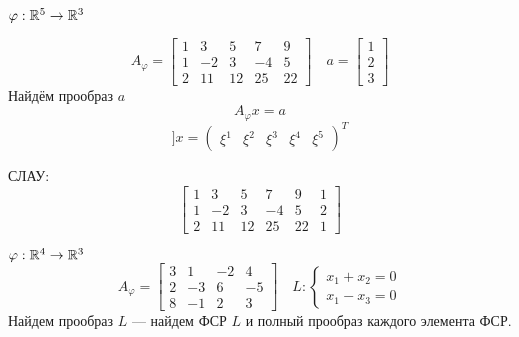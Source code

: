 \begin{example}
    $\varphi : \mathbb{R}^5\to\mathbb{R}^3$

    $$A_\varphi = \begin{bmatrix}
        1 & 3 & 5 & 7 & 9 \\
        1 & -2 & 3 & -4 & 5 \\
        2 & 11 & 12 & 25 & 22
    \end{bmatrix} \quad a=\begin{bmatrix} 1 \\ 2 \\ 3\end{bmatrix}$$
    Найдём прообраз $a$
    $$A_\varphi x = a$$
    $$] x = \begin{pmatrix}
        \xi^1 & \xi^2 & \xi^3 & \xi^4 & \xi^5
    \end{pmatrix}^T$$

    СЛАУ:
    $$\begin{bmatrix}
        1 & 3 & 5 & 7 & 9 & 1 \\
        1 & -2 & 3 & -4 & 5 & 2 \\
        2 & 11 & 12 & 25 & 22 & 1
    \end{bmatrix}$$
\end{example}

\begin{example}
    $\varphi : \mathbb{R}^4 \to \mathbb{R}^3$
    $$A_\varphi = \begin{bmatrix}
        3 & 1 & -2 & 4 \\
        2 & -3 & 6 & -5 \\
        8 & -1 & 2 & 3
    \end{bmatrix} \quad L:\begin{cases}
        x_1 + x_2 = 0 \\
        x_1 - x_3 = 0
    \end{cases}$$
    Найдем прообраз $L$ --- найдем ФСР $L$ и полный прообраз каждого элемента ФСР.
\end{example}

